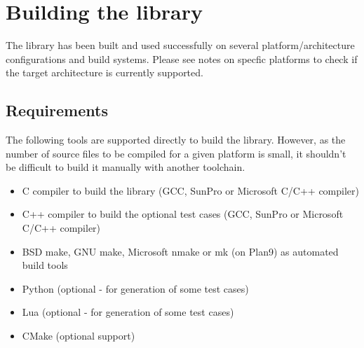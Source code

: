 %
%
%
%

\newpage
\section{Building the library}

The library has been built and used successfully on several 
platform/architecture configurations and build systems.
Please see notes on specfic platforms to check if the target
architecture is currently supported.


\subsection{Requirements}

The following tools are supported directly to build the  library.
However, as the number of source files to be compiled for a given
platform is small, it shouldn't be difficult to build it manually with
another toolchain.
\begin{itemize}
\item C compiler to build the  library (GCC, SunPro or Microsoft C/C++ compiler)
\item C++ compiler to build the optional test cases (GCC, SunPro or Microsoft C/C++ compiler)
\item BSD make, GNU make, Microsoft nmake or mk (on Plan9) as automated build tools
\item Python (optional - for generation of some test cases)
\item Lua (optional - for generation of some test cases)
\item CMake (optional support)
\end{itemize}


